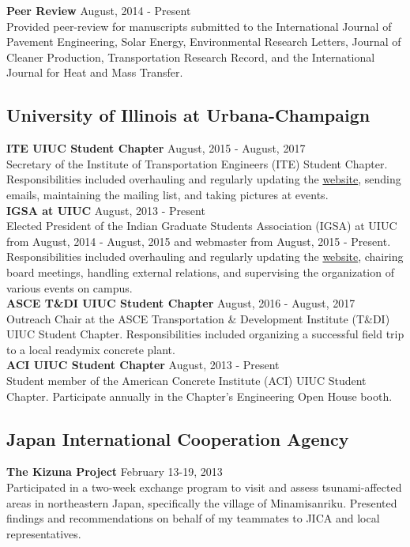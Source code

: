 \documentclass[12pt]{article}
\begin{document}
\textbf{Peer Review} \hfill August, 2014 - Present \\
Provided peer-review for manuscripts submitted to the International Journal of Pavement Engineering, Solar Energy, Environmental Research Letters, Journal of Cleaner Production, Transportation Research Record, and the International Journal for Heat and Mass Transfer. \\

\subsection*{University of Illinois at Urbana-Champaign} 
\textbf{ITE UIUC Student Chapter} \hfill August, 2015 - August, 2017 \\
Secretary of the Institute of Transportation Engineers (ITE) Student Chapter. Responsibilities included overhauling and regularly updating the \href{https://iteuiuc.wordpress.com/}{website}, sending emails, maintaining the mailing list, and taking pictures at events. \\

\textbf{IGSA at UIUC} \hfill August, 2013 - Present \\
Elected President of the Indian Graduate Students Association (IGSA) at UIUC from August, 2014 - August, 2015 and webmaster from August, 2015 - Present. Responsibilities included overhauling and regularly updating the \href{http://igsauiuc.com/?i=1}{website}, chairing board meetings, handling external relations, and supervising the organization of various events on campus. \\

\textbf{ASCE T\&DI UIUC Student Chapter} \hfill August, 2016 - August, 2017 \\
Outreach Chair at the ASCE Transportation \& Development Institute (T\&DI) UIUC Student Chapter. Responsibilities included organizing a successful field trip to a local readymix concrete plant. \\

\textbf{ACI UIUC Student Chapter} \hfill August, 2013 - Present \\
Student member of the American Concrete Institute (ACI) UIUC Student Chapter. Participate annually in the Chapter's Engineering Open House booth. \\

\subsection*{Japan International Cooperation Agency}
\textbf{The Kizuna Project} \hfill February 13-19, 2013\\
Participated in a two-week exchange program to visit and assess tsunami-affected areas in northeastern Japan, specifically the village of Minamisanriku. Presented findings and recommendations on behalf of my teammates to JICA and local representatives. \\
\end{document}
